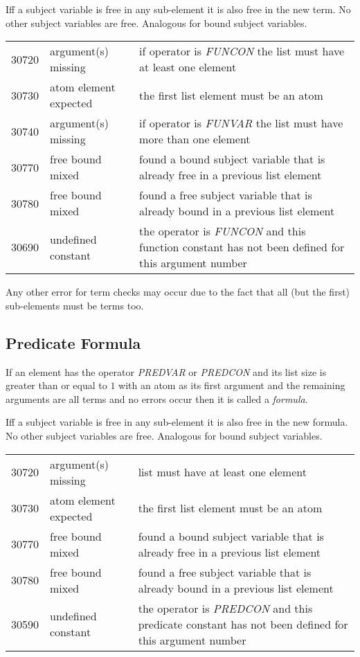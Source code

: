 \documentclass[a4paper,german,10pt,twoside]{book}
\theoremstyle{definition}
\theoremstyle{remark}
\begin{document}
\par
Iff a subject variable is free in any sub-element it is also free in the new term. No other subject variables are free. Analogous for bound subject variables. 


\begin{tabularx}{\linewidth}{llX}
  30720  & argument(s) missing      & if operator is \emph{FUNCON} the list must have at least one element \\
  30730  & atom element expected    & the first list element must be an atom \\ 
  30740  & argument(s) missing      & if operator is \emph{FUNVAR} the list must have more than one element \\
  30770  & free bound mixed         & found a bound subject variable that is already free in a previous list element \\
  30780  & free bound mixed         & found a free subject variable that is already bound in a previous list element \\
  30690  & undefined constant       & the operator is \emph{FUNCON} and this function constant has not been defined for this argument number
\end{tabularx}

\par
Any other error for term checks may occur due to the fact that all (but the first) sub-elements must be terms too.


\subsection{Predicate Formula
}
If an element has the operator \emph{PREDVAR} or \emph{PREDCON} and its list size is greater than or equal to $1$ with an atom as its first argument and the remaining arguments are all terms and no errors occur then it is called a \emph{formula}.

\par
Iff a subject variable is free in any sub-element it is also free in the new formula. No other subject variables are free. Analogous for bound subject variables. 

\begin{tabularx}{\linewidth}{llX}
  30720  & argument(s) missing      & list must have at least one element \\
  30730  & atom element expected    & the first list element must be an atom \\ 
  30770  & free bound mixed         & found a bound subject variable that is already free in a previous list element \\
  30780  & free bound mixed         & found a free subject variable that is already bound in a previous list element \\
  30590  & undefined constant       & the operator is \emph{PREDCON} and this predicate constant has not been defined for this argument number
\end{tabularx}
\end{document}
